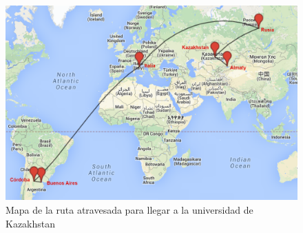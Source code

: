 \begin{figure}[H]
	\begin{center}
		  \includegraphics[scale=0.4]{../mapas/mapa_aipet.png}
		  \caption{Mapa de la ruta atravesada para llegar a la universidad de Kazakhstan}
		  \label{fig:contra1}
	\end{center}
\end{figure}


